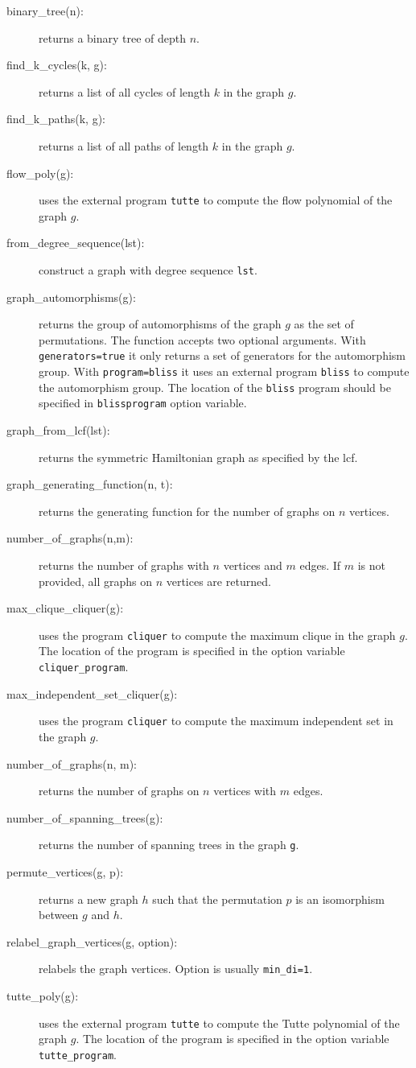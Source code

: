\documentclass[11pt]{article}
\begin{document}
\begin{description}
  \item [binary\_tree(n):] returns a binary tree of depth $n$.
  \item [find\_k\_cycles(k, g):] returns a list of all cycles of
    length $k$ in the graph $g$.
  \item [find\_k\_paths(k, g):] returns a list of all paths of length
    $k$ in the graph $g$.
  \item [flow\_poly(g):] uses the external program \verb|tutte| to
    compute the flow polynomial of the graph $g$.
  \item [from\_degree\_sequence(lst):] construct a graph with degree
    sequence \verb|lst|.
  \item [graph\_automorphisms(g):] returns the group of automorphisms
    of the graph $g$ as the set of permutations. The function accepts
    two optional arguments. With \texttt{generators=true} it only
    returns a set of generators for the automorphism group. With
    \texttt{program=bliss} it uses an external program \texttt{bliss}
    to compute the automorphism group. The location of the
    \texttt{bliss} program should be specified in
    \texttt{blissprogram} option variable.
  \item [graph\_from\_lcf(lst):] returns the symmetric Hamiltonian
    graph as specified by the lcf.
  \item [graph\_generating\_function(n, t):] returns the generating
    function for the number of graphs on $n$ vertices.
  \item [number\_of\_graphs(n,m):] returns the number of graphs with
    $n$ vertices and $m$ edges. If $m$ is not provided, all graphs on
    $n$ vertices are returned.
  \item [max\_clique\_cliquer(g):] uses the program \verb|cliquer| to
    compute the maximum clique in the graph $g$. The location of the
    program is specified in the option variable
    \verb|cliquer_program|.
  \item [max\_independent\_set\_cliquer(g):] uses the program
    \verb|cliquer| to compute the maximum independent set in the graph
    $g$.
  \item [number\_of\_graphs(n, m):] returns the number of graphs on
    $n$ vertices with $m$ edges.
  \item [number\_of\_spanning\_trees(g):] returns the number of
    spanning trees in the graph \verb|g|.
  \item [permute\_vertices(g, p):] returns a new graph $h$ such
    that the permutation $p$ is an isomorphism between $g$ and $h$.
  \item [relabel\_graph\_vertices(g, option):] relabels the graph
    vertices. Option is usually \verb|min_di=1|.
  \item [tutte\_poly(g):] uses the external program \verb|tutte| to
    compute the Tutte polynomial of the graph $g$. The location of the
    program is specified in the option variable \verb|tutte_program|.
\end{description}
\end{document}
